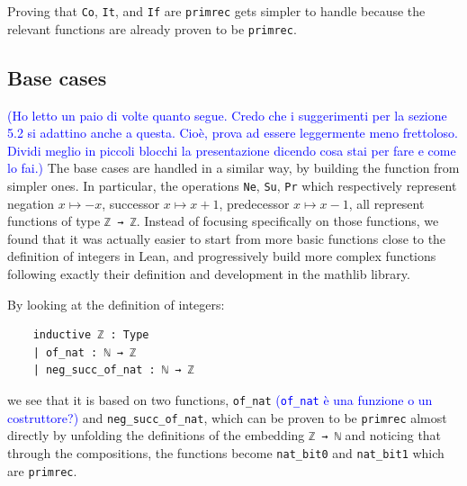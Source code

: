 \documentclass[preprint]{elsarticle}
\theoremstyle{remark}
\newcommand{\MATHLIB}{\textsf{mathlib}\xspace}
\newcommand{\LEAN}{\textsf{Lean}\xspace}
\begin{document}
\vspace{\baselineskip}
Proving that \lstinline|Co|, \lstinline|It|, and \lstinline|If| are \lstinline|primrec| gets simpler to handle because the relevant functions are already proven to be \lstinline|primrec|.

\subsection{Base cases}
\textcolor{blue}{(Ho letto un paio di volte quanto segue. Credo che i suggerimenti per la sezione 5.2 si adattino anche a questa. Cioè, prova ad essere leggermente meno frettoloso. Dividi meglio in piccoli blocchi la presentazione dicendo cosa stai per fare e come lo fai.)}
The base cases are handled in a similar way, by building the function from simpler ones. In particular, the operations \lstinline|Ne|, \lstinline|Su|, \lstinline|Pr| which respectively represent negation $x\mapsto-x$, successor $x\mapsto x+1$, predecessor $x\mapsto x-1$, all represent functions of type \lstinline|ℤ → ℤ|. Instead of focusing specifically on those functions, we found that it was actually easier to start from more basic functions close to the definition of integers in \LEAN, and progressively build more complex functions following exactly their definition and development in the \MATHLIB library.

By looking at the definition of integers:
\begin{lstlisting}
    inductive ℤ : Type
    | of_nat : ℕ → ℤ
    | neg_succ_of_nat : ℕ → ℤ
\end{lstlisting}
\noindent
we see that it is based on two functions, \lstinline|of_nat| \textcolor{blue}{(\texttt{of_nat} è una funzione o un costruttore?)} and \lstinline|neg_succ_of_nat|, which can be proven to be \lstinline|primrec| almost directly by unfolding the definitions of the embedding \lstinline|ℤ → ℕ| and noticing that through the compositions, the functions become \lstinline|nat_bit0| and \lstinline|nat_bit1| which are \lstinline|primrec|.
\end{document}
